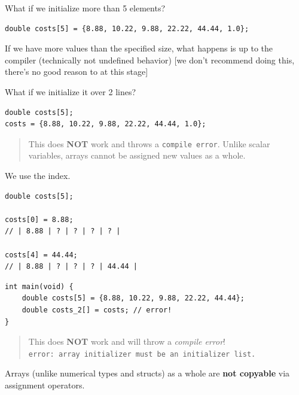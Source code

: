 \documentclass[11pt,a4paper]{article}
\begin{document}
What if we initialize more than 5 elements?

\begin{lstlisting}[style=cscode]
double costs[5] = {8.88, 10.22, 9.88, 22.22, 44.44, 1.0};
\end{lstlisting}

If we have more values than the specified size, what happens is up to the compiler (technically not undefined behavior) {[}we don't recommend doing this, there's no good reason to at this stage{]}

What if we initialize it over 2 lines?

\begin{lstlisting}[style=cscode]
double costs[5];
costs = {8.88, 10.22, 9.88, 22.22, 44.44, 1.0};
\end{lstlisting}

\begin{quote}
This does \textbf{NOT} work and throws a \texttt{compile\ error}. Unlike scalar variables, arrays cannot be assigned new values as a whole.
\end{quote}

\label{313-accessing-an-array-writing}
\hypertarget{313-accessing-an-array-writing}{}

We use the index.

\begin{lstlisting}[style=cscode]
double costs[5];

costs[0] = 8.88;
// | 8.88 | ? | ? | ? | ? |

costs[4] = 44.44;
// | 8.88 | ? | ? | ? | 44.44 |
\end{lstlisting}

\label{314-copying-semantics}
\hypertarget{314-copying-semantics}{}

\begin{lstlisting}[style=cscode]
int main(void) {
    double costs[5] = {8.88, 10.22, 9.88, 22.22, 44.44};
    double costs_2[] = costs; // error!
}
\end{lstlisting}

\begin{quote}
This does \textbf{NOT} work and will throw a \emph{compile error}! \texttt{error:\ array\ initializer\ must\ be\ an\ initializer\ list.}
\end{quote}

Arrays (unlike numerical types and structs) as a whole are \textbf{not copyable} via assignment operators.
\end{document}
